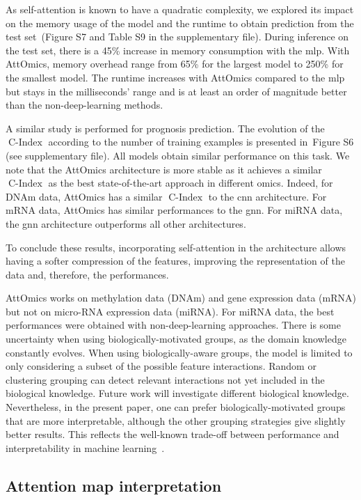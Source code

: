 \documentclass[../main.tex]{subfiles}
\begin{document}
As self-attention is known to have a quadratic complexity, we explored its impact on the memory usage of the model and the runtime to obtain prediction from the test set~(Figure S7 and Table S9 in the supplementary file).
During inference on the test set, there is a 45\% increase in memory consumption with the \gls{mlp}.
With AttOmics, memory overhead range from 65\% for the largest model to 250\% for the smallest model.
The runtime increases with AttOmics compared to the \gls{mlp} but stays in the milliseconds' range and is at least an order of magnitude better than the non-deep-learning methods.


A similar study is performed for prognosis prediction.
The evolution of the $\operatorname{C-Index}$ according to the number of training examples is presented in~Figure S6 (see supplementary file).
All models obtain similar performance on this task.
We note that the AttOmics architecture is more stable as it achieves a similar $\operatorname{C-Index}$ as the best state-of-the-art approach in different omics.
Indeed, for DNAm data, AttOmics has a similar $\operatorname{C-Index}$ to the \gls{cnn} architecture. For mRNA data, AttOmics has similar performances to the \gls{gnn}.
For miRNA data, the \gls{gnn} architecture outperforms all other architectures.

To conclude these results, incorporating self-attention in the architecture allows having a softer compression of the features, improving the representation of the data and, therefore, the performances.

AttOmics works on methylation data (DNAm) and gene expression data (mRNA) but not on micro-RNA expression data (miRNA).
For miRNA data, the best performances were obtained with non-deep-learning approaches.
There is some uncertainty when using biologically-motivated groups, as the domain knowledge constantly evolves.
When using biologically-aware groups, the model is limited to only considering a subset of the possible feature interactions.
Random or clustering grouping can detect relevant interactions not yet included in the biological knowledge.
Future work will investigate different biological knowledge.
Nevertheless, in the present paper, one can prefer biologically-motivated groups that are more interpretable, although the other grouping strategies give slightly better results.
This reflects the well-known trade-off between performance and interpretability in machine learning~\cite{Linardatos2021_ExplainableAI}.

\subsection{Attention map interpretation}
\end{document}
